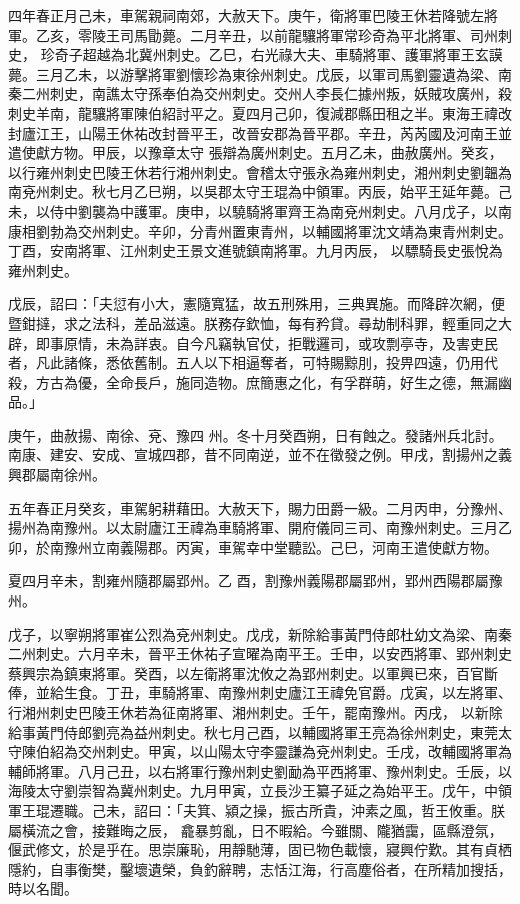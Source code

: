\begin{pinyinscope}
 四年春正月己未，車駕親祠南郊，大赦天下。庚午，衛將軍巴陵王休若降號左將軍。乙亥，零陵王司馬勖薨。二月辛丑，以前龍驤將軍常珍奇為平北將軍、司州刺史，
 珍奇子超越為北冀州刺史。乙巳，右光祿大夫、車騎將軍、護軍將軍王玄謨薨。三月乙未，以游擊將軍劉懷珍為東徐州刺史。戊辰，以軍司馬劉靈遺為梁、南秦二州刺史，南譙太守孫奉伯為交州刺史。交州人李長仁據州叛，妖賊攻廣州，殺刺史羊南，龍驤將軍陳伯紹討平之。夏四月己卯，復減郡縣田租之半。東海王禕改封廬江王，山陽王休祐改封晉平王，改晉安郡為晉平郡。辛丑，芮芮國及河南王並遣使獻方物。甲辰，以豫章太守
 張辯為廣州刺史。五月乙未，曲赦廣州。癸亥，以行雍州刺史巴陵王休若行湘州刺史。會稽太守張永為雍州刺史，湘州刺史劉韞為南兗州刺史。秋七月乙巳朔，以吳郡太守王琨為中領軍。丙辰，始平王延年薨。己未，以侍中劉襲為中護軍。庚申，以驍騎將軍齊王為南兗州刺史。八月戊子，以南康相劉勃為交州刺史。辛卯，分青州置東青州，以輔國將軍沈文靖為東青州刺史。丁酉，安南將軍、江州刺史王景文進號鎮南將軍。九月丙辰，
 以驃騎長史張悅為雍州刺史。



 戊辰，詔曰：「夫愆有小大，憲隨寬猛，故五刑殊用，三典異施。而降辟次網，便暨鉗撻，求之法科，差品滋遠。朕務存欽恤，每有矜貸。尋劫制科罪，輕重同之大辟，即事原情，未為詳衷。自今凡竊執官仗，拒戰邏司，或攻剽亭寺，及害吏民者，凡此諸條，悉依舊制。五人以下相逼奪者，可特賜黥刖，投畀四遠，仍用代殺，方古為優，全命長戶，施同造物。庶簡惠之化，有孚群萌，好生之德，無漏幽品。」



 庚午，曲赦揚、南徐、兗、豫四
 州。冬十月癸酉朔，日有蝕之。發諸州兵北討。南康、建安、安成、宣城四郡，昔不同南逆，並不在徵發之例。甲戌，割揚州之義興郡屬南徐州。



 五年春正月癸亥，車駕躬耕藉田。大赦天下，賜力田爵一級。二月丙申，分豫州、揚州為南豫州。以太尉廬江王禕為車騎將軍、開府儀同三司、南豫州刺史。三月乙卯，於南豫州立南義陽郡。丙寅，車駕幸中堂聽訟。己巳，河南王遣使獻方物。



 夏四月辛未，割雍州隨郡屬郢州。乙
 酉，割豫州義陽郡屬郢州，郢州西陽郡屬豫州。



 戊子，以寧朔將軍崔公烈為兗州刺史。戊戌，新除給事黃門侍郎杜幼文為梁、南秦二州刺史。六月辛未，晉平王休祐子宣曜為南平王。壬申，以安西將軍、郢州刺史蔡興宗為鎮東將軍。癸酉，以左衛將軍沈攸之為郢州刺史。以軍興已來，百官斷俸，並給生食。丁丑，車騎將軍、南豫州刺史廬江王禕免官爵。戊寅，以左將軍、行湘州刺史巴陵王休若為征南將軍、湘州刺史。壬午，罷南豫州。丙戌，
 以新除給事黃門侍郎劉亮為益州刺史。秋七月己酉，以輔國將軍王亮為徐州刺史，東莞太守陳伯紹為交州刺史。甲寅，以山陽太守李靈謙為兗州刺史。壬戌，改輔國將軍為輔師將軍。八月己丑，以右將軍行豫州刺史劉勔為平西將軍、豫州刺史。壬辰，以海陵太守劉崇智為冀州刺史。九月甲寅，立長沙王纂子延之為始平王。戊午，中領軍王琨遷職。己未，詔曰：「夫箕、潁之操，振古所貴，沖素之風，哲王攸重。朕屬橫流之會，接難晦之辰，
 龕暴剪亂，日不暇給。今雖關、隴猶靄，區縣澄氛，偃武修文，於是乎在。思崇廉恥，用靜馳薄，固已物色載懷，寢興佇歎。其有貞栖隱約，自事衡樊，鑿壞遺榮，負釣辭聘，志恬江海，行高塵俗者，在所精加搜括，時以名聞。




\end{pinyinscope}
